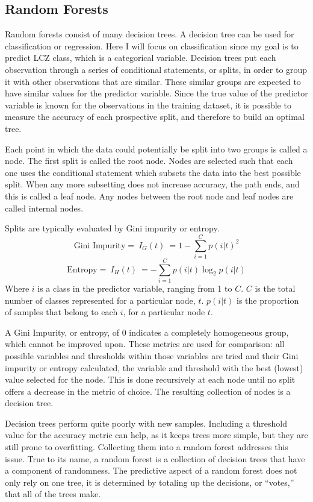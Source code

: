\documentclass[
]{article}
\begin{document}
\hypertarget{random-forests}{%
\subsection{Random Forests}\label{random-forests}}

Random forests consist of many decision trees. A decision tree can be
used for classification or regression. Here I will focus on
classification since my goal is to predict LCZ class, which is a
categorical variable. Decision trees put each observation through a
series of conditional statements, or splits, in order to group it with
other observations that are similar. These similar groups are expected
to have similar values for the predictor variable. Since the true value
of the predictor variable is known for the observations in the training
dataset, it is possible to measure the accuracy of each prospective
split, and therefore to build an optimal tree.

Each point in which the data could potentially be split into two groups
is called a node. The first split is called the root node. Nodes are
selected such that each one uses the conditional statement which subsets
the data into the best possible split. When any more subsetting does not
increase accuracy, the path ends, and this is called a leaf node. Any
nodes between the root node and leaf nodes are called internal nodes.

Splits are typically evaluated by Gini impurity or entropy. \[
\text{Gini Impurity} =\ I_G(t)\  = 1 - \sum_{i=1}^{C}p(i|t)^2
\] \[
\text{Entropy} =\ I_H(t)\ = -\sum_{i=1}^{C}p(i|t)\log_2p(i|t)
\] Where \(i\) is a class in the predictor variable, ranging from 1 to
\(C\). \(C\) is the total number of classes represented for a particular
node, \(t\). \(p(i|t)\) is the proportion of samples that belong to each
\(i\), for a particular node \(t\).

A Gini Impurity, or entropy, of 0 indicates a completely homogeneous
group, which cannot be improved upon. These metrics are used for
comparison: all possible variables and thresholds within those variables
are tried and their Gini impurity or entropy calculated, the variable
and threshold with the best (lowest) value selected for the node. This
is done recursively at each node until no split offers a decrease in the
metric of choice. The resulting collection of nodes is a decision tree.

Decision trees perform quite poorly with new samples. Including a
threshold value for the accuracy metric can help, as it keeps trees more
simple, but they are still prone to overfitting. Collecting them into a
random forest addresses this issue. True to its name, a random forest is
a collection of decision trees that have a component of randomness. The
predictive aspect of a random forest does not only rely on one tree, it
is determined by totaling up the decisions, or ``votes,'' that all of
the trees make.
\end{document}
